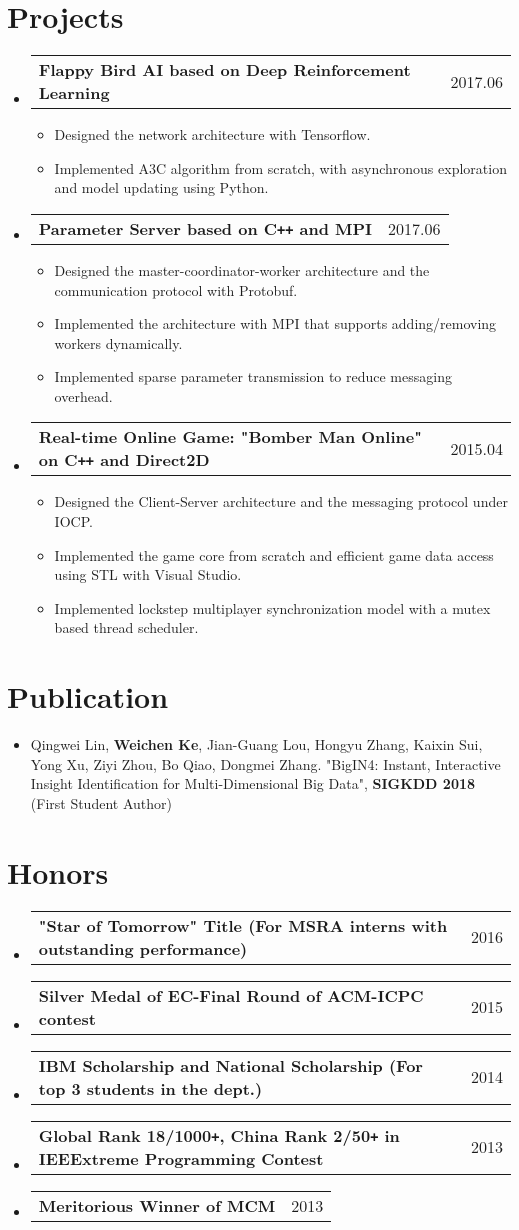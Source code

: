 \documentclass[a4paper,11pt]{article}
\makeatletter
\newcommand{\resumeItem}[1]{
  \item\small{#1 \vspace{-2pt}}
}
\newcommand{\resumeMiniheading}[2]{
  \vspace{-1pt}\item
    \begin{tabular*}{0.97\textwidth}{l@{\extracolsep{\fill}}r}
      \textbf{#1} & #2
    \end{tabular*}
}
\newcommand{\resumeSubHeadingListStart}{\begin{itemize}[leftmargin=*, itemsep=6pt]}
\newcommand{\resumeSubHeadingListEnd}{\end{itemize}}
\newcommand{\resumeItemListStart}{\begin{itemize}[leftmargin=*, topsep=0ex]}
\newcommand{\resumeItemListEnd}{\end{itemize}}
\makeatother
\begin{document}
\section{Projects}
  \resumeSubHeadingListStart
    \resumeMiniheading{Flappy Bird AI based on Deep Reinforcement Learning }{2017.06}
        \resumeItemListStart
            \resumeItem {Designed the network architecture with Tensorflow.}
            \resumeItem {Implemented A3C algorithm from scratch, with asynchronous exploration and model updating using Python.}
        \resumeItemListEnd
    
    \resumeMiniheading{Parameter Server based on C\texttt{++} and MPI}{2017.06}
        \resumeItemListStart
            \resumeItem {Designed the master-coordinator-worker architecture and the communication protocol with Protobuf.}
            \resumeItem {Implemented the architecture with MPI that supports adding/removing workers dynamically.}
            \resumeItem {Implemented sparse parameter transmission to reduce messaging overhead.}
        \resumeItemListEnd
        
    \resumeMiniheading{Real-time Online Game: "Bomber Man Online" on C\texttt{++} and Direct2D}{2015.04}
        \resumeItemListStart
            \resumeItem {Designed the Client-Server architecture and the messaging protocol under IOCP.}
            \resumeItem {Implemented the game core from scratch and efficient game data access using STL with Visual Studio.}
            \resumeItem {Implemented lockstep multiplayer synchronization model with a mutex based thread scheduler.}
        \resumeItemListEnd
        
  \resumeSubHeadingListEnd

\section{Publication}
  \resumeItemListStart
    \resumeItem 
    {Qingwei Lin, \textbf{Weichen Ke}, Jian-Guang Lou, Hongyu Zhang, Kaixin Sui, Yong Xu, Ziyi Zhou, Bo Qiao, Dongmei Zhang. "BigIN4: Instant, Interactive Insight Identification for Multi-Dimensional Big Data", \textbf{SIGKDD 2018} (First Student Author) }
  \resumeItemListEnd

\section{Honors}
  \begin{itemize}[leftmargin=*, itemsep=-12pt]
    \resumeMiniheading{"Star of Tomorrow" Title {\normalfont(For MSRA interns with outstanding performance)}}{2016}
    \resumeMiniheading{Silver Medal of EC-Final Round of ACM-ICPC contest}{2015}
    \resumeMiniheading{IBM Scholarship and National Scholarship {\normalfont(For top 3 students in the dept.)}}{2014}
    \resumeMiniheading{Global Rank 18/1000\texttt{+}, China Rank 2/50\texttt{+} in IEEExtreme Programming Contest}{2013}
    \resumeMiniheading{Meritorious Winner of MCM}{2013}
  \end{itemize}
\end{document}
